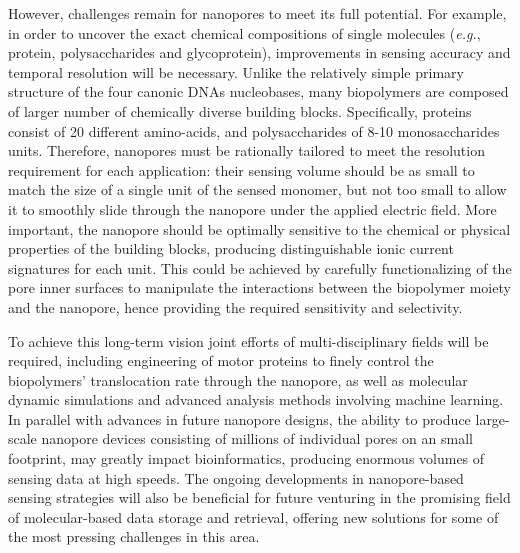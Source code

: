 However, challenges remain for nanopores to meet its full potential. For example, in order to uncover the exact chemical compositions of single molecules (\emph{e.g.}, protein, polysaccharides and glycoprotein), improvements in sensing accuracy and temporal resolution will be necessary. Unlike the relatively simple primary structure of the four cano\-nic DNAs nucleobases, many biopolymers are composed of larger number of chemically diverse building blocks. Specifically, proteins consist of 20 different amino-acids, and polysaccharides of 8-10 monosaccharides units. Therefore, nanopores must be rationally tailored to meet the resolution requirement for each application: their sensing volume should be as small to match the size of a single unit of the sensed monomer, but not too small to allow it to smoothly slide through the nanopore under the applied electric field. More important, the nanopore should be optimally sensitive to the chemical or physical properties of the building blocks, producing distinguishable ionic current signatures for each unit. This could be achieved by carefully functionalizing of the pore inner surfaces to manipulate the interactions between the biopolymer moiety and the nanopore, hence providing the required sensitivity and selectivity. 


To achieve this long-term vision joint efforts of multi-disciplinary fields will be required, including engineering of motor proteins to finely control the biopolymers’ translocation rate through the nanopore, as well as molecular dynamic simulations and advanced analysis methods involving machine learning. In parallel with advances in future nanopore designs, the ability to produce large-scale nanopore devices consisting of millions of individual pores on an small footprint, may greatly impact bioinformatics, producing enormous volumes of sensing data at high speeds. The ongoing developments in nanopore-based sensing strategies will also be beneficial for future venturing in the promising field of molecular-based data storage and retrieval, offering new solutions for some of the most pressing challenges in this area.



